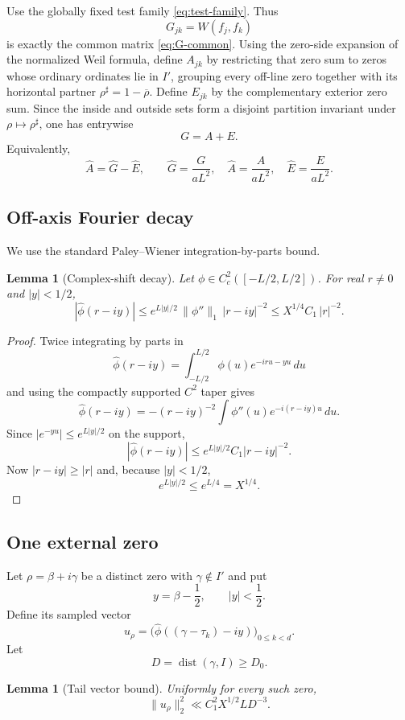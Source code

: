 \documentclass[11pt]{article}
\newtheorem{lemma}[theorem]{Lemma}
\begin{document}
Use the globally fixed test family \eqref{eq:test-family}. Thus
\[
 G_{jk}=W(f_j,f_k)
\]
is exactly the common matrix \eqref{eq:G-common}.
Using the zero-side expansion of the normalized Weil formula, define
$A_{jk}$ by restricting that zero sum to zeros whose ordinary ordinates lie
in $I'$, grouping every off-line zero together with its horizontal partner
$\rho^\sharp=1-\overline\rho$.  Define $E_{jk}$ by the complementary
exterior zero sum.  Since the inside and outside sets form a disjoint
partition invariant under $\rho\mapsto\rho^\sharp$, one has entrywise
\[
 \boxed{G=A+E.}
\]
Equivalently,
\[
 \widehat A=\widehat G-\widehat E,
 \qquad
 \widehat G=\frac{G}{aL^2},\quad
 \widehat A=\frac{A}{aL^2},\quad
 \widehat E=\frac{E}{aL^2}.
\]

\subsection{Off-axis Fourier decay}

We use the standard Paley--Wiener integration-by-parts bound.

\begin{lemma}[Complex-shift decay]\label{aii:lem:complexdecay}
Let $\phi\in C_c^2([-L/2,L/2])$.  For real $r\ne0$ and
$|y|<1/2$,
\[
 |\widehat\phi(r-iy)|
 \le
 e^{L|y|/2}\,\|\phi''\|_1\,|r-iy|^{-2}
 \le
 X^{1/4}C_1\,|r|^{-2}.
\]
\end{lemma}

\begin{proof}
Twice integrating by parts in
\[
 \widehat\phi(r-iy)
 =\int_{-L/2}^{L/2}
 \phi(u)e^{-iru-yu}\,du
\]
and using the compactly supported $C^2$ taper gives
\[
 \widehat\phi(r-iy)
 =
 -(r-iy)^{-2}
 \int\phi''(u)e^{-i(r-iy)u}\,du.
\]
Since $|e^{-yu}|\le e^{L|y|/2}$ on the support,
\[
 |\widehat\phi(r-iy)|
 \le e^{L|y|/2}C_1|r-iy|^{-2}.
\]
Now $|r-iy|\ge|r|$ and, because $|y|<1/2$,
\[
 e^{L|y|/2}\le e^{L/4}=X^{1/4}.
\]
\end{proof}

\subsection{One external zero}

Let $\rho=\beta+i\gamma$ be a distinct zero with $\gamma\notin I'$ and put
\[
 y=\beta-\frac12,\qquad |y|<\frac12.
\]
Define its sampled vector
\[
 u_\rho=
 \bigl(\widehat\phi((\gamma-\tau_k)-iy)\bigr)_{0\le k<d}.
\]
Let
\[
 D=\operatorname{dist}(\gamma,I)\ge D_0.
\]

\begin{lemma}[Tail vector bound]\label{aii:lem:vector}
Uniformly for every such zero,
\[
 \|u_\rho\|_2^2
 \ll C_1^2X^{1/2}L D^{-3}.
\]
\end{lemma}
\end{document}
